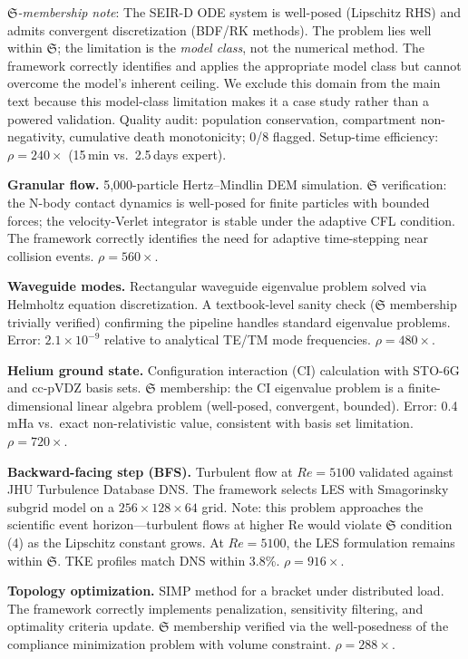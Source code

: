 \documentclass[11pt,a4paper]{article}
\newcommand{\Sclass}{\mathfrak{S}}
\begin{document}
\emph{$\Sclass$-membership note}: The SEIR-D ODE system is well-posed (Lipschitz RHS) and admits convergent discretization (BDF/RK methods). The problem lies well within $\Sclass$; the limitation is the \emph{model class}, not the numerical method. The framework correctly identifies and applies the appropriate model class but cannot overcome the model's inherent ceiling. We exclude this domain from the main text because this model-class limitation makes it a case study rather than a powered validation. Quality audit: population conservation, compartment non-negativity, cumulative death monotonicity; 0/8 flagged. Setup-time efficiency: $\rho = 240\times$ (15\,min vs.\ 2.5\,days expert).

\textbf{Granular flow.} 5,000-particle Hertz--Mindlin DEM simulation. $\Sclass$ verification: the N-body contact dynamics is well-posed for finite particles with bounded forces; the velocity-Verlet integrator is stable under the adaptive CFL condition. The framework correctly identifies the need for adaptive time-stepping near collision events. $\rho = 560\times$.

\textbf{Waveguide modes.} Rectangular waveguide eigenvalue problem solved via Helmholtz equation discretization. A textbook-level sanity check ($\Sclass$ membership trivially verified) confirming the pipeline handles standard eigenvalue problems. Error: $2.1 \times 10^{-9}$ relative to analytical TE/TM mode frequencies. $\rho = 480\times$.

\textbf{Helium ground state.} Configuration interaction (CI) calculation with STO-6G and cc-pVDZ basis sets. $\Sclass$ membership: the CI eigenvalue problem is a finite-dimensional linear algebra problem (well-posed, convergent, bounded). Error: 0.4\,mHa vs.\ exact non-relativistic value, consistent with basis set limitation. $\rho = 720\times$.

\textbf{Backward-facing step (BFS).} Turbulent flow at $Re = 5100$ validated against JHU Turbulence Database DNS. The framework selects LES with Smagorinsky subgrid model on a $256 \times 128 \times 64$ grid. Note: this problem approaches the scientific event horizon---turbulent flows at higher Re would violate $\Sclass$ condition (4) as the Lipschitz constant grows. At $Re = 5100$, the LES formulation remains within $\Sclass$. TKE profiles match DNS within 3.8\%. $\rho = 916\times$.

\textbf{Topology optimization.} SIMP method for a bracket under distributed load. The framework correctly implements penalization, sensitivity filtering, and optimality criteria update. $\Sclass$ membership verified via the well-posedness of the compliance minimization problem with volume constraint. $\rho = 288\times$.
\end{document}
